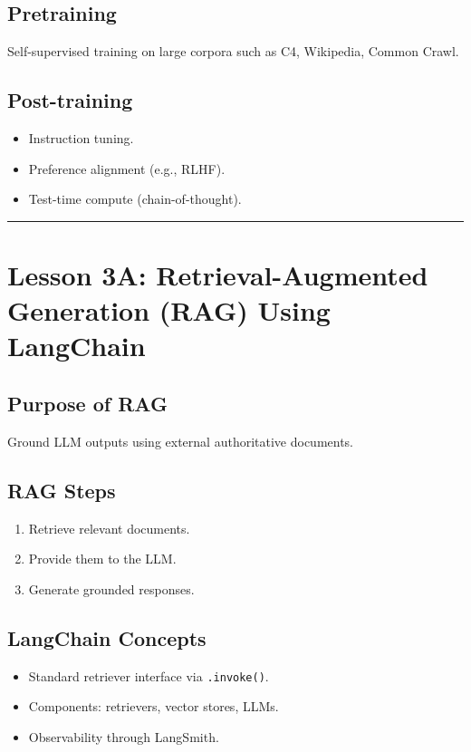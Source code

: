 \documentclass[12pt]{article}
\begin{document}
\subsection*{Pretraining}
Self-supervised training on large corpora such as C4, Wikipedia, Common Crawl.

\subsection*{Post-training}
\begin{itemize}
    \item Instruction tuning.
    \item Preference alignment (e.g., RLHF).
    \item Test-time compute (chain-of-thought).
\end{itemize}

\bigskip
\hrule
\bigskip

\section*{Lesson 3A: Retrieval-Augmented Generation (RAG) Using LangChain}

\subsection*{Purpose of RAG}
Ground LLM outputs using external authoritative documents.

\subsection*{RAG Steps}
\begin{enumerate}
    \item Retrieve relevant documents.
    \item Provide them to the LLM.
    \item Generate grounded responses.
\end{enumerate}

\subsection*{LangChain Concepts}
\begin{itemize}
    \item Standard retriever interface via \texttt{.invoke()}.
    \item Components: retrievers, vector stores, LLMs.
    \item Observability through LangSmith.
\end{itemize}
\end{document}
